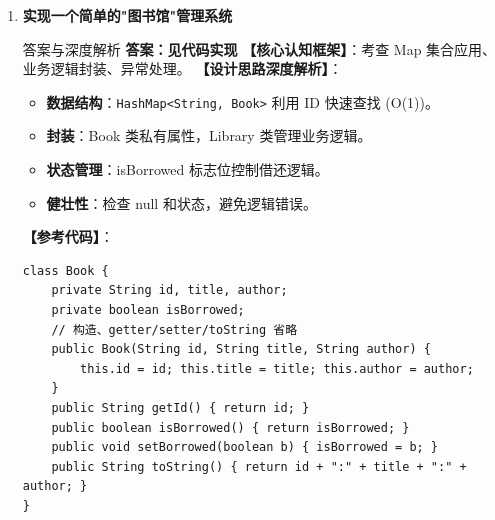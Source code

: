 \documentclass[12pt, a4paper]{ctexart}
\newcommand{\code}[1]{\texttt{\color{myblue}#1}}
\begin{document}
\begin{enumerate}[label=\arabic*.]
\begin{bluebox}{答案与深度解析}
\begin{lstlisting}
public class Main {
    public static void main(String[] args) {
        ArrayList<Animal> list = new ArrayList<>();
        list.add(new Dog("旺财", 3, "哈士奇"));
        list.add(new Cat("咪咪", 2, "白色"));
        for (Animal a : list) {
            a.makeSound();
            System.out.println(a.getName() + "," + a.getAge());
            if (a instanceof Dog) {
                System.out.println("品种:" + ((Dog)a).getBreed());
            } else if (a instanceof Cat) {
                System.out.println("颜色:" + ((Cat)a).getColor());
            }
        }
    }
}
\end{lstlisting}
		      \textbf{【考点延伸】}：
		      \begin{itemize}[leftmargin=*, nosep]
			      \item \textbf{instanceof}：运行时类型检查，避免 ClassCastException。
			      \item \textbf{泛型}：\code{ArrayList<Animal>} 保证类型安全。
			      \item \textbf{多态}：调用 makeSound 时动态绑定子类实现。
		      \end{itemize}
	      \end{bluebox}

	\item \textbf{实现一个简单的"图书馆"管理系统}
	      \begin{bluebox}{答案与深度解析}
		      \textbf{答案：见代码实现}
		      \textbf{【核心认知框架】}：考查 Map 集合应用、业务逻辑封装、异常处理。
		      \textbf{【设计思路深度解析】}：
		      \begin{itemize}[leftmargin=*, nosep]
			      \item \textbf{数据结构}：\code{HashMap<String, Book>} 利用 ID 快速查找 (O(1))。
			      \item \textbf{封装}：Book 类私有属性，Library 类管理业务逻辑。
			      \item \textbf{状态管理}：isBorrowed 标志位控制借还逻辑。
			      \item \textbf{健壮性}：检查 null 和状态，避免逻辑错误。
		      \end{itemize}
		      \textbf{【参考代码】}：
		      \begin{lstlisting}
class Book {
    private String id, title, author;
    private boolean isBorrowed;
    // 构造、getter/setter/toString 省略
    public Book(String id, String title, String author) {
        this.id = id; this.title = title; this.author = author;
    }
    public String getId() { return id; }
    public boolean isBorrowed() { return isBorrowed; }
    public void setBorrowed(boolean b) { isBorrowed = b; }
    public String toString() { return id + ":" + title + ":" + author; }
}


\end{lstlisting}
\end{bluebox}
\end{enumerate}
\end{document}
